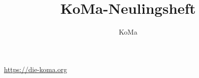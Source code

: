 \documentclass{neulingsheft}
\title{KoMa-Neulingsheft}
\author{KoMa}
\begin{document}
\maketitle









\clearpage
\centering\url{https://die-koma.org}
\end{document}
